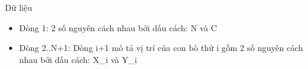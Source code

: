 Dữ liệu  
\begin{itemize}
	\item     Dòng 1: 2 số nguyên cách nhau bởi dấu cách: N và C   
	\item     Dòng 2..N+1: Dòng i+1 mô tả vị trí của con bò thứ i gồm 2 số nguyên cách nhau bởi dấu cách: X\_i và Y\_i   
\end{itemize}
